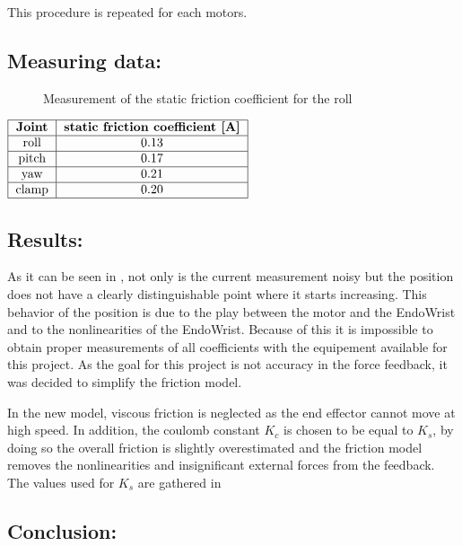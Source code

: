 This procedure is repeated for each motors.

\subsection*{Measuring data:}
\begin{figure}[H]
	\centering
	
	\caption{Measurement of the static friction coefficient for the roll}
	\label{fig:friction_measurement}
\end{figure}

\begin{center}
  $\begin{tabular}{|c|c|}
    \hline
    \textbf{Joint} & \textbf{static friction coefficient [A]} \\
    \hline
    roll & 0.13 \\
    \hline
    pitch & 0.17  \\
    \hline
    yaw & 0.21  \\
    \hline
    clamp & 0.20\\
    \hline
  \end{tabular}$
	\label{fig:static_friction_coefficient}
\end{center}
\subsection*{Results:}

As it can be seen in , not only is the current measurement noisy but the position does not have a clearly distinguishable point where it starts increasing. This behavior of the position is due to the play between the motor and the EndoWrist and to the nonlinearities of the EndoWrist. Because of this it is impossible to obtain proper measurements of all coefficients with the equipement available for this project. As the goal for this project is not accuracy in the force feedback, it was decided to simplify the friction model.

In the new model, viscous friction is neglected as the end effector cannot move at high speed. In addition, the coulomb constant $K_c$ is chosen to be equal to $K_s$, by doing so the overall friction is slightly overestimated and the friction model removes the nonlinearities and insignificant external forces from the feedback. The values used for $K_s$ are gathered in 
\subsection*{Conclusion:}

